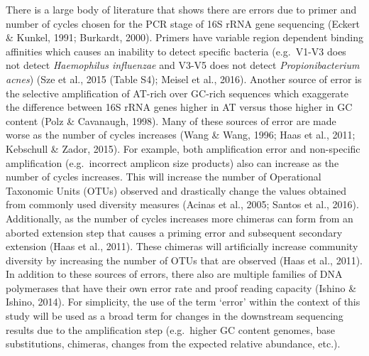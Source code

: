 \documentclass[11pt,]{article}
\begin{document}
There is a large body of literature that shows there are errors due to
primer and number of cycles chosen for the PCR stage of 16S rRNA gene
sequencing (Eckert \& Kunkel, 1991; Burkardt, 2000). Primers have
variable region dependent binding affinities which causes an inability
to detect specific bacteria (e.g.~V1-V3 does not detect
\emph{Haemophilus influenzae} and V3-V5 does not detect
\emph{Propionibacterium acnes}) (Sze et al., 2015 (Table S4); Meisel et
al., 2016). Another source of error is the selective amplification of
AT-rich over GC-rich sequences which exaggerate the difference between
16S rRNA genes higher in AT versus those higher in GC content (Polz \&
Cavanaugh, 1998). Many of these sources of error are made worse as the
number of cycles increases (Wang \& Wang, 1996; Haas et al., 2011;
Kebschull \& Zador, 2015). For example, both amplification error and
non-specific amplification (e.g.~incorrect amplicon size products) also
can increase as the number of cycles increases. This will increase the
number of Operational Taxonomic Units (OTUs) observed and drastically
change the values obtained from commonly used diversity measures (Acinas
et al., 2005; Santos et al., 2016). Additionally, as the number of
cycles increases more chimeras can form from an aborted extension step
that causes a priming error and subsequent secondary extension (Haas et
al., 2011). These chimeras will artificially increase community
diversity by increasing the number of OTUs that are observed (Haas et
al., 2011). In addition to these sources of errors, there also are
multiple families of DNA polymerases that have their own error rate and
proof reading capacity (Ishino \& Ishino, 2014). For simplicity, the use
of the term `error' within the context of this study will be used as a
broad term for changes in the downstream sequencing results due to the
amplification step (e.g.~higher GC content genomes, base substitutions,
chimeras, changes from the expected relative abundance, etc.).
\end{document}
